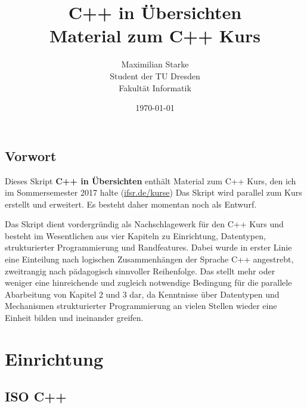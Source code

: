 \documentclass[a4paper]{report}
\title{C++ in Übersichten \\ \medskip \large Material zum C++ Kurs}
\author{Maximilian Starke \\ Student der TU Dresden \\ Fakultät Informatik}
\date{\today}
\begin{document}
\maketitle

\section*{Vorwort}
Dieses Skript \textbf{C++ in Übersichten} enthält Material zum C++ Kurs, den ich im Sommersemester 2017 halte (\url{ifsr.de/kurse})
Das Skript wird parallel zum Kurs erstellt und erweitert. Es besteht daher momentan noch als Entwurf.

Das Skript dient vordergründig als Nachschlagewerk für den C++ Kurs und besteht im Wesentlichen aus vier Kapiteln zu Einrichtung, Datentypen, strukturierter Programmierung und Randfeatures. Dabei wurde in erster Linie eine Einteilung nach logischen Zusammenhängen der Sprache C++ angestrebt, zweitrangig nach pädagogisch sinnvoller Reihenfolge. Das stellt mehr oder weniger eine hinreichende und zugleich notwendige Bedingung für die parallele Abarbeitung von Kapitel 2 und 3 dar, da Kenntnisse über Datentypen und Mechanismen strukturierter Programmierung an vielen Stellen wieder eine Einheit bilden und ineinander greifen.

\tableofcontents

\chapter{Einrichtung}

\section{ISO C++}
\end{document}
